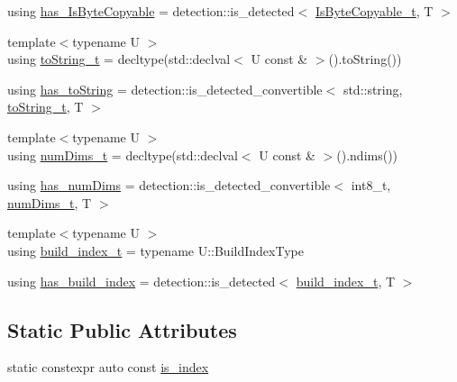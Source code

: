 \begin{DoxyCompactItemize}
\item 
using \hyperlink{structvt_1_1index_1_1_index_traits_ab35645966fbb207e0e70982a610f1eb2}{has\+\_\+\+Is\+Byte\+Copyable} = detection\+::is\+\_\+detected$<$ \hyperlink{structvt_1_1index_1_1_index_traits_a6869472628098b68d1ce678422814734}{Is\+Byte\+Copyable\+\_\+t}, T $>$
\item 
{\footnotesize template$<$typename U $>$ }\\using \hyperlink{structvt_1_1index_1_1_index_traits_afd3d724feb07329acc70afc067320558}{to\+String\+\_\+t} = decltype(std\+::declval$<$ U const  \& $>$().to\+String())
\item 
using \hyperlink{structvt_1_1index_1_1_index_traits_ae91e2c26896622d9eab9416b4141042f}{has\+\_\+to\+String} = detection\+::is\+\_\+detected\+\_\+convertible$<$ std\+::string, \hyperlink{structvt_1_1index_1_1_index_traits_afd3d724feb07329acc70afc067320558}{to\+String\+\_\+t}, T $>$
\item 
{\footnotesize template$<$typename U $>$ }\\using \hyperlink{structvt_1_1index_1_1_index_traits_a9c055598424a66789ec9a5986c2ace3a}{num\+Dims\+\_\+t} = decltype(std\+::declval$<$ U const  \& $>$().ndims())
\item 
using \hyperlink{structvt_1_1index_1_1_index_traits_aa063bfa4f5eec4fea36c7ee151519ceb}{has\+\_\+num\+Dims} = detection\+::is\+\_\+detected\+\_\+convertible$<$ int8\+\_\+t, \hyperlink{structvt_1_1index_1_1_index_traits_a9c055598424a66789ec9a5986c2ace3a}{num\+Dims\+\_\+t}, T $>$
\item 
{\footnotesize template$<$typename U $>$ }\\using \hyperlink{structvt_1_1index_1_1_index_traits_a8a367bc83d2a3bd52bd5007efd6ff110}{build\+\_\+index\+\_\+t} = typename U\+::\+Build\+Index\+Type
\item 
using \hyperlink{structvt_1_1index_1_1_index_traits_a9507b2186fbda410df0f7c685504e314}{has\+\_\+build\+\_\+index} = detection\+::is\+\_\+detected$<$ \hyperlink{structvt_1_1index_1_1_index_traits_a8a367bc83d2a3bd52bd5007efd6ff110}{build\+\_\+index\+\_\+t}, T $>$
\end{DoxyCompactItemize}
\subsection*{Static Public Attributes}
\begin{DoxyCompactItemize}
\item 
static constexpr auto const \hyperlink{structvt_1_1index_1_1_index_traits_a254b0c96b3b6a75e56e3d7ddd3787621}{is\+\_\+index}
\end{DoxyCompactItemize}


